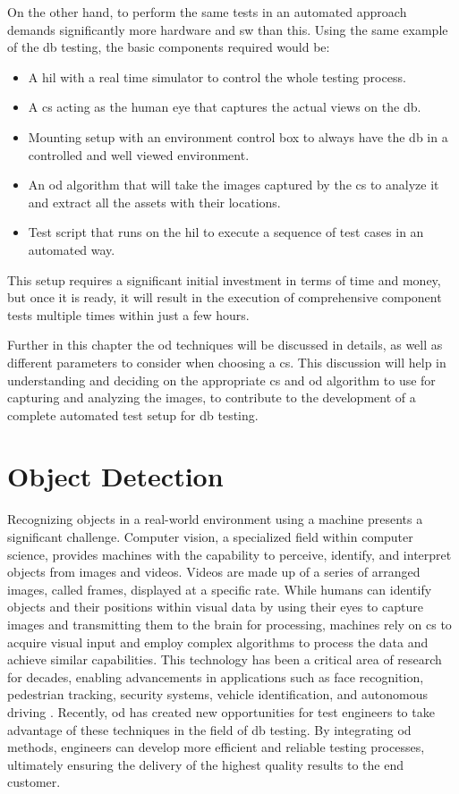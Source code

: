 On the other hand, to perform the same tests in an automated approach demands significantly more hardware and \gls{sw} than this. Using the same example of the \gls{db} testing, the basic components required would be:
\begin{itemize}
    \item A \gls{hil} with a real time simulator to control the whole testing process.
    \item  A \gls{cs} acting as the human eye that captures the actual views on the \gls{db}.
    \item Mounting setup with an environment control box to always have the \gls{db} in a controlled and well viewed environment.
    \item An \gls{od} algorithm that will take the images captured by the \gls{cs} to analyze it and extract all the assets with their locations.
    \item Test script that runs on the \gls{hil} to execute a sequence of test cases in an automated way.
\end{itemize}
This setup requires a significant initial investment in terms of time and money, but once it is ready, it will result in the execution of comprehensive component tests multiple times within just a few hours.

Further in this chapter the \gls{od} techniques will be discussed in details, as well as different parameters to consider when choosing a \gls{cs}. This discussion will help in understanding and deciding on the appropriate \gls{cs} and \gls{od} algorithm to use for capturing and analyzing the images, to contribute to the development of a complete automated test setup for \gls{db} testing.

\section{Object Detection}
Recognizing objects in a real-world environment using a machine presents a significant challenge. Computer vision, a specialized field within computer science, provides machines with the capability to perceive, identify, and interpret objects from images and videos. Videos are made up of a series of arranged images, called frames, displayed at a specific rate. While humans can identify objects and their positions within visual data by using their eyes to capture images and transmitting them to the brain for processing, machines rely on \gls{cs} to acquire visual input and employ complex algorithms to process the data and achieve similar capabilities. This technology has been a critical area of research for decades, enabling advancements in applications such as face recognition, pedestrian tracking, security systems, vehicle identification, and autonomous driving \cite{oD_Review}. Recently, \gls{od} has created new opportunities for test engineers to take advantage of these techniques in the field of \gls{db} testing. By integrating \gls{od} methods, engineers can develop more efficient and reliable testing processes, ultimately ensuring the delivery of the highest quality results to the end customer.

